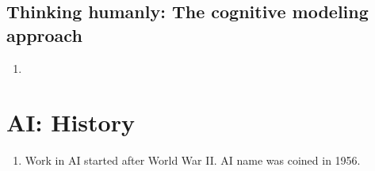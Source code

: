 








\subsection{Thinking humanly: The cognitive modeling approach}\label{Artificial Intelligence: Introduction/Approaches to AI/Thinking humanly: The cognitive modeling approach}

\begin{enumerate}
    \item 
\end{enumerate}






















\section{AI: History}\label{Artificial Intelligence: Introduction/AI: History}

\begin{enumerate}
    \item Work in AI started after World War II. AI name was coined in 1956. 
    \hfill \cite{ai/book/Artificial-Intelligence-A-Modern-Approach/Russell-Norvig}

    
\end{enumerate}




